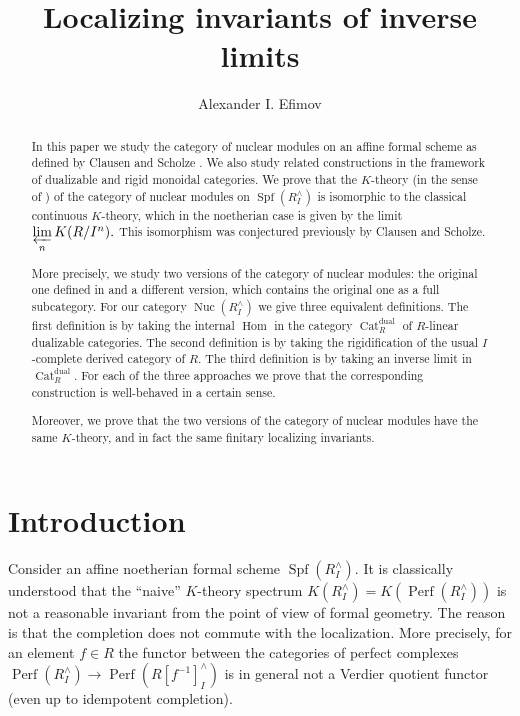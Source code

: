 \documentclass[11pt,leqno]{amsart}
\title[Localizing invariants of inverse limits]
{Localizing invariants of inverse limits}
\author{Alexander I. Efimov}
\numberwithin{equation}{section}
\def\Hom{\operatorname{Hom}}
\newcommand{\prolim}[1][]{\mathop{\varprojlim}\limits_{#1}}
\newcommand{\Nuc}{\operatorname{Nuc}}
\newcommand{\Cat}{\operatorname{Cat}}
\newcommand{\dual}{\operatorname{dual}}
\newcommand{\Perf}{\operatorname{Perf}}
\newcommand{\Spf}{\operatorname{Spf}}
\begin{document}
\begin{abstract} In this paper we study the category of nuclear modules on an affine formal scheme as defined by Clausen and Scholze \cite{CS20}. We also study related constructions in the framework of dualizable and rigid monoidal categories. We prove that the $K$-theory (in the sense of \cite{E24}) of the category of nuclear modules on $\Spf(R^{\wedge}_I)$ is isomorphic to the classical continuous $K$-theory, which in the noetherian case is given by the limit $\prolim[n]K(R/I^n).$ This isomorphism was conjectured previously by Clausen and Scholze.

More precisely, we study two versions of the category of nuclear modules: the original one defined in \cite{CS20} and a different version, which contains the original one as a full subcategory. For our category $\Nuc(R^{\wedge}_I)$ we give three equivalent definitions. The first definition is by taking the internal $\Hom$ in the category $\Cat_R^{\dual}$ of $R$-linear dualizable categories. The second definition is by taking the rigidification of the usual $I$-complete derived category of $R.$ The third definition is by taking an inverse limit in $\Cat_R^{\dual}.$ For each of the three approaches we prove that the corresponding construction is well-behaved in a certain sense. 

Moreover, we prove that the two versions of the category of nuclear modules have the same $K$-theory, and in fact the same finitary localizing invariants.
\end{abstract}


\maketitle

\tableofcontents

\section{Introduction}
\label{sec:intro}

 Consider an affine noetherian formal scheme $\Spf(R^{\wedge}_I).$ It is classically understood that the ``naive'' $K$-theory spectrum $K(R^{\wedge}_I)=K(\Perf(R^{\wedge}_I))$ is not a reasonable invariant from the point of view of formal geometry. The reason is that the completion does not commute with the localization. More precisely, for an element $f\in R$ the functor between the categories of perfect complexes $\Perf(R^{\wedge}_I)\to \Perf(R[f^{-1}]^{\wedge}_I)$ is in general not a Verdier quotient functor (even up to idempotent completion). 
 
\end{document}
